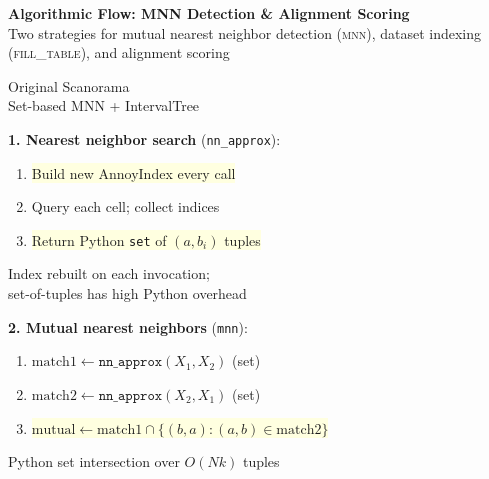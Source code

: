 \documentclass[8pt]{article}
\newlength{\colw}
\begin{document}
\setlength{\colw}{0.48\textwidth}

\begin{center}
{\large\bfseries Algorithmic Flow: MNN Detection \& Alignment Scoring}\\[1pt]
{\scriptsize Two strategies for mutual nearest neighbor detection (\textsc{mnn}), dataset indexing (\textsc{fill\_table}), and alignment scoring}
\end{center}
\vspace{2pt}

\noindent
\begin{minipage}[t]{\colw}
\begin{tcolorbox}[colback=hdrA, colframe=hdrA, fontupper=\bfseries\footnotesize\color{white},
    arc=2pt, left=2pt, right=2pt, top=1pt, bottom=1pt]
\centering Original Scanorama\\[-2pt]
{\scriptsize\mdseries Set-based MNN + IntervalTree}
\end{tcolorbox}
\vspace{1pt}

\begin{warnbox}
\textbf{1. Nearest neighbor search} (\texttt{nn\_approx}):
\begin{enumerate}[leftmargin=1em, itemsep=0pt, topsep=1pt, parsep=0pt]
\item \colorbox{lightyellow}{Build new AnnoyIndex every call}
\item Query each cell; collect indices
\item \colorbox{lightyellow}{Return Python \texttt{set} of $(a, b_i)$ tuples}
\end{enumerate}
{\scriptsize\color{removed} Index rebuilt on each invocation;\\
set-of-tuples has high Python overhead}
\end{warnbox}\vspace{1pt}

\begin{warnbox}
\textbf{2. Mutual nearest neighbors} (\texttt{mnn}):
\begin{enumerate}[leftmargin=1em, itemsep=0pt, topsep=1pt, parsep=0pt]
\item $\text{match1} \gets \texttt{nn\_approx}(X_1, X_2)$ {\scriptsize (set)}
\item $\text{match2} \gets \texttt{nn\_approx}(X_2, X_1)$ {\scriptsize (set)}
\item \colorbox{lightyellow}{$\text{mutual} \gets \text{match1} \cap \{(b,a) : (a,b) \in \text{match2}\}$}
\end{enumerate}
{\scriptsize\color{removed} Python set intersection over $O(Nk)$ tuples}
\end{warnbox}\vspace{1pt}


\end{minipage}
\end{document}

